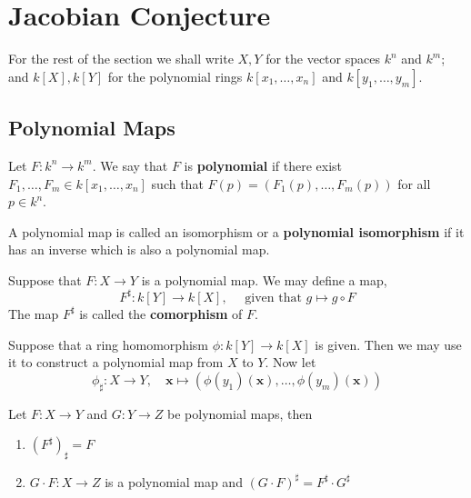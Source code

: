 \documentclass[12pt, oneside]{book}
\begin{document}
\chapter{Jacobian Conjecture}
For the rest of the section we shall write $X, Y$ for the vector spaces $k^n$ and $k^m$; and $k[X], k[Y]$ for the polynomial rings $k\left[x_1, \ldots, x_n\right]$ and $k\left[y_1, \ldots, y_m\right]$.
\section{Polynomial Maps}
\begin{definition}
    Let $F: k^n \rightarrow k^m$.
    We say that $F$ is \textbf{polynomial} if there exist $F_1, \ldots, F_m \in k\left[x_1, \ldots, x_n\right]$ such that $F(p)= \left(F_1(p), \ldots, F_m(p)\right)$ for all $p\in k^n$.

    A polynomial map is called an isomorphism or a \textbf{polynomial isomorphism} if it has an inverse which is also a polynomial map.


\end{definition}

\begin{definition}
    Suppose that $F: X \rightarrow Y$ is a polynomial map. We may define a map,
    \begin{equation*}
        F^{\sharp}: k[Y] \rightarrow  k[X] ,\quad  \text{ given that } g\mapsto g \circ F
    \end{equation*}
    The map $F^{\sharp}$ is called the \textbf{comorphism} of $F$.

    Suppose that a ring homomorphism $\phi: k[Y] \rightarrow k[X]$ is given. Then we may use it to construct a polynomial map from $X$ to $Y$. Now let
    \begin{equation*}
        \phi_{\sharp}: X \rightarrow Y
        ,\quad
        \mathbf{x}
        \mapsto
        \left(\phi\left(y_1\right)\left(\mathbf{x}\right),\ldots,\phi\left(y_m\right)\left(\mathbf{x}\right)\right)
    \end{equation*}
\end{definition}


\begin{theorem}
    Let $F: X \rightarrow Y$ and $G: Y \rightarrow Z$ be polynomial maps, then
    \begin{enumerate}
        \item
              $\left(F^{\sharp}\right)_{\sharp}=F$
        \item $G \cdot F: X \rightarrow Z$ is a polynomial map and $(G \cdot F)^{\sharp}=F^{\sharp} \cdot G^{\sharp}$
    \end{enumerate}
\end{theorem}
\end{document}
